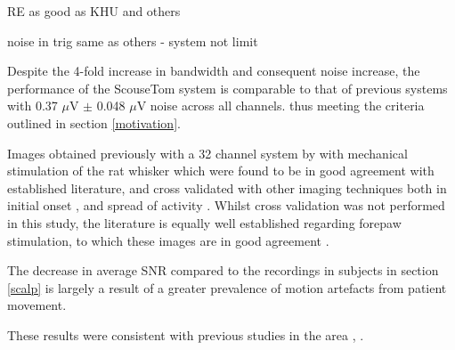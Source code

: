 RE as good as KHU and others

noise in trig same as others - system not limit



Despite the 4-fold increase in bandwidth and consequent noise increase, the performance of the ScouseTom system is comparable to that of previous systems \cite{Oh2011} with 0.37 $\mu$V $\pm$ 0.048 $\mu$V noise across all channels.
 thus meeting the criteria outlined in section \ref{motivation}.

Images obtained previously with a 32 channel system by \citet{Aristovich_2016} with mechanical stimulation of the rat whisker which were found to be in good agreement with established literature, and cross validated with other imaging techniques both in initial onset \cite{armstrong1991thalamo}, and spread of activity \cite{petersen2007functional}. Whilst cross validation was not performed in this study, the literature is equally well established regarding forepaw stimulation, to which these images are in good agreement \cite{peeters2001comparing} \cite{masamoto2007relationship} \cite{lowe2007small}.



The decrease in average SNR compared to the recordings in subjects in section \ref{scalp} is largely a result of a greater prevalence of motion artefacts from patient movement. 


These results were consistent with previous studies in the area \cite{Ranck_1963}, \cite{Logothetis_2007}.



